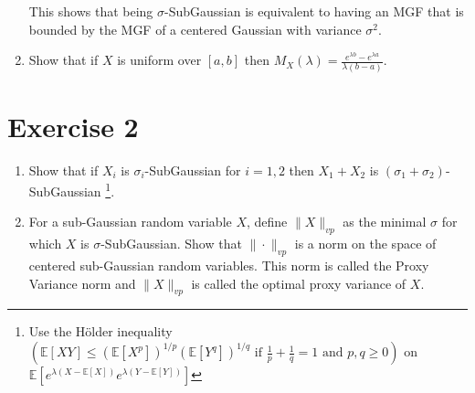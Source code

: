 \documentclass[a4 paper]{article}
\numberwithin{equation}{section}
\theoremstyle{boldStyle}
\theoremstyle{boldBlueStyle}
\theoremstyle{boldPurpleStyle}
\theoremstyle{boldRedStyle}
\begin{document}
\begin{enumerate}
This shows that being \(\sigma\)-SubGaussian is equivalent to having an MGF that is bounded by the MGF of a centered Gaussian with variance \(\sigma^2\).










    
    
\newpage
\item Show that if \(X\) is uniform over \([a, b]\) then \(M_X(\lambda) = \frac{e^{\lambda b} - e^{\lambda a}}{\lambda (b - a)}\).



\end{enumerate}
















\newpage
\section*{Exercise 2}
\begin{enumerate}
\item Show that if \(X_i\) is \(\sigma_i\)-SubGaussian for \(i = 1, 2\) then \(X_1 + X_2\) is \((\sigma_1 + \sigma_2)\)-SubGaussian
\footnote{Use the Hölder inequality \((\mathbb{E}[XY] \leq (\mathbb{E}[X^p])^{1/p} (\mathbb{E}[Y^q])^{1/q} \text{ if } \frac{1}{p} + \frac{1}{q} = 1 \text{ and } p, q \geq 0)\) 
on \(\mathbb{E}[e^{\lambda (X - \mathbb{E}[X])} e^{\lambda (Y - \mathbb{E}[Y])}]\)}.



\newpage
\item For a sub-Gaussian random variable \(X\), define \(\|X\|_{vp}\) as the minimal \(\sigma\) for which \(X\) is \(\sigma\)-SubGaussian. 
Show that \(\|\cdot\|_{vp}\) is a norm on the space of centered sub-Gaussian random variables. This norm is called the Proxy Variance norm and \(\|X\|_{vp}\) 
is called the optimal proxy variance of \(X\).



\end{enumerate}

\newpage
\end{document}
